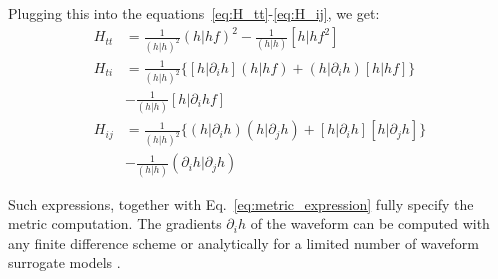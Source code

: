 \documentclass[twocolumn,showpacs,preprintnumbers,nofootinbib,prd,
superscriptaddress,10pt]{revtex4-2}
\newcommand{\rescalar}[2]{( #1|#2 )}
\newcommand{\imscalar}[2]{[ #1|#2 ]}
\begin{document}
Plugging this into the equations~\eqref{eq:H_tt}-\eqref{eq:H_ij}, we get:
\begin{align}
	H_{tt} &= \frac{1}{\rescalar{h}{h}^{2}} \rescalar{{h}}{{h}f}^2 - \frac{1}{\rescalar{h}{h}} \imscalar{h}{{h} f^2 } \label{eq:H_tt_grad} \\
	H_{ti} &= \frac{1}{\rescalar{h}{h}^{2}} \Big\{ \imscalar{h}{\partial_i {h}} \rescalar{{h}}{{h}f} +\rescalar{h}{\partial_i {h}} \imscalar{h}{hf} \Big\} \nonumber \\
	&- \frac{1}{\rescalar{h}{h}} \imscalar{h}{\partial_i{h} f } \label{eq:H_ti_grad} \\
	H_{ij} &=  \frac{1}{\rescalar{h}{h}^{2}} \Big\{ \rescalar{h}{\partial_i {h}} \rescalar{{h}}{\partial_j {h}} +\imscalar{h}{\partial_i {h}} \imscalar{h}{\partial_j {h}} \Big\} \nonumber \\
	&- \frac{1}{\rescalar{h}{h}} \rescalar{\partial_i h}{\partial_j {h}} \label{eq:H_ij_grad} 
\end{align}

Such expressions, together with Eq.~\eqref{eq:metric_expression} fully specify the metric computation.
The gradients $\partial_i h$ of the waveform can be computed with any finite difference scheme or analytically for a limited number of waveform surrogate models \cite{PhysRevD.103.043020, Khan:2020fso, Tissino:2022thn}.

	
	
\end{document}

